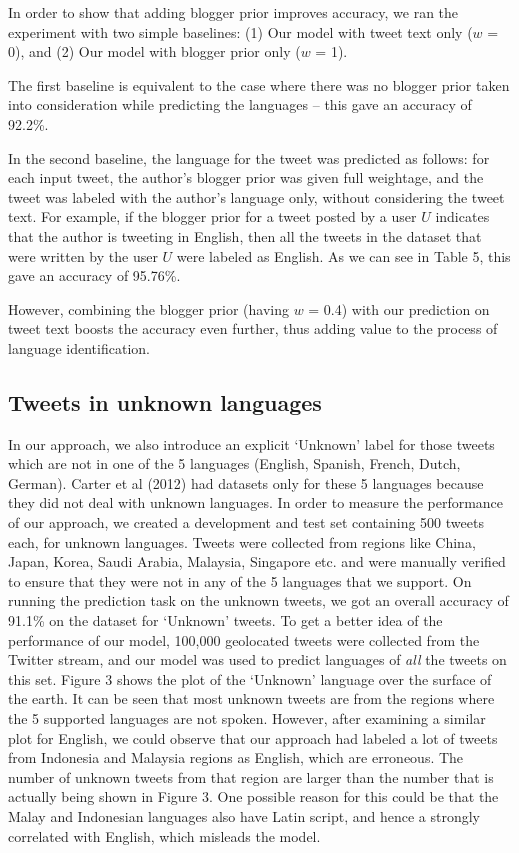 \documentclass[11pt]{article}
\begin{document}
In order to show that adding blogger prior improves accuracy, we ran the experiment with two simple baselines: (1) Our model with tweet text only ($w$ = 0), and (2) Our model with blogger prior only ($w$ = 1).

The first baseline is equivalent to the case where there was no blogger prior taken into consideration while predicting the languages -- this gave an accuracy of 92.2\%.

In the second baseline, the language for the tweet was predicted as follows: for each input tweet, the author's blogger prior was given full weightage, and the tweet was labeled with the author's language only, without considering the tweet text. For example, if the blogger prior for a tweet posted by a user $U$ indicates that the author is tweeting in English, then all the tweets in the dataset that were written by the user $U$ were labeled as English. As we can see in Table 5, this gave an accuracy of 95.76\%.

However, combining the blogger prior (having $w$ = 0.4) with our prediction on tweet text boosts the accuracy even further, thus adding value to the process of language identification.

\subsection{Tweets in unknown languages}
In our approach, we also introduce an explicit `Unknown' label for those tweets which are not in one of the 5 languages (English, Spanish, French, Dutch, German). Carter et al (2012) had datasets only for these 5 languages because they did not deal with unknown languages. In order to measure the performance of our approach, we created a development and test set containing 500 tweets each, for unknown languages. Tweets were collected from regions like China, Japan, Korea, Saudi Arabia, Malaysia, Singapore etc. and were manually verified to ensure that they were not in any of the 5 languages that we support. On running the prediction task on the unknown tweets, we got an overall accuracy of 91.1\% on the dataset for `Unknown' tweets. To get a better idea of the performance of our model, 100,000 geolocated tweets were collected from the Twitter stream, and our model was used to predict languages of \emph{all} the tweets on this set. Figure 3 shows the plot of the `Unknown' language over the surface of the earth. It can be seen that most unknown tweets are from the regions where the 5 supported languages are not spoken. However, after examining a similar plot for English, we could observe that our approach had labeled a lot of tweets from Indonesia and Malaysia regions as English, which are erroneous. The number of unknown tweets from that region are larger than the number that is actually being shown in Figure 3. One possible reason for this could be that the Malay and Indonesian languages also have Latin script, and hence a strongly correlated with English, which misleads the model.
\end{document}
